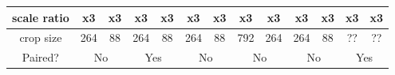 \begin{table}[H]
{\begin{tabular}{c|cccc|cccc|cccc}
    scale ratio & \multicolumn{1}{c|}{x3}                                                      & \multicolumn{1}{c|}{x3}                                                                & x3                                                     & x3                                                                & x3                                                     & \multicolumn{1}{c|}{x3}                                                      & x3                                                     & x3                                                      & x3                                                     & \multicolumn{1}{c|}{x3}                                                      & x3                                                     & \multicolumn{1}{c|}{x3}                                                      \\ \hline
    crop size   & \multicolumn{1}{c|}{264}                                                     & \multicolumn{1}{c|}{88}                                                                & 264                                                    & 88                                                                & 264                                                    & \multicolumn{1}{c|}{88}                                                      & 792                                                    & 264                                                     & 264                                                    & \multicolumn{1}{c|}{88}                                                      & ??                                                     & \multicolumn{1}{c|}{??}                                                      \\ \hline
    Paired?     & \multicolumn{2}{c|}{No}                                                                                                                                               & \multicolumn{2}{c|}{Yes}                                                                                                   & \multicolumn{2}{c|}{No}                                                                                                               & \multicolumn{2}{c|}{No}                                                                                          & \multicolumn{2}{c|}{No}                                                                                                               & \multicolumn{2}{c}{Yes}                                                                                                               \\ \hline

\end{tabular}}
\end{table}
